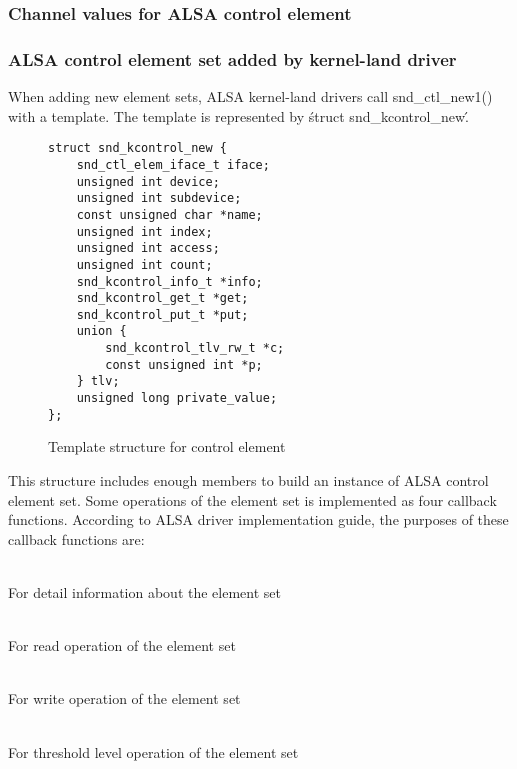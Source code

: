 \documentclass[onecolumn]{article}
\begin{document}
\subsubsection{Channel values for ALSA control element}

\subsubsection{ALSA control element set added by kernel-land driver}

When adding new element sets, ALSA kernel-land drivers call snd\_ctl\_new1() with a template. The template is represented by \'struct snd\_kcontrol\_new\'.

\begin{figure}[htbp]
\small
\begin{verbatim}
struct snd_kcontrol_new {
    snd_ctl_elem_iface_t iface;
    unsigned int device;
    unsigned int subdevice;
    const unsigned char *name;
    unsigned int index;
    unsigned int access;
    unsigned int count;
    snd_kcontrol_info_t *info;
    snd_kcontrol_get_t *get;
    snd_kcontrol_put_t *put;
    union {
        snd_kcontrol_tlv_rw_t *c;
        const unsigned int *p;
    } tlv;
    unsigned long private_value;
};
\end{verbatim}
\caption{{Template structure for control element}}
\label{control-element-template}
\end{figure}

This structure includes enough members to build an instance of ALSA control element set. Some operations of the element set is implemented as four callback functions. According to ALSA driver implementation guide\cite{alsa-driver}, the purposes of these callback functions are:

\begin{description}
\small
\item[snd\_kcontrol\_info\_t] \mbox{} \\
For detail information about the element set
\item[snd\_kcontrol\_get\_t] \mbox{} \\
For read operation of the element set
\item[snd\_kcontrol\_put\_t] \mbox{} \\
For write operation of the element set
\item[snd\_kctl\_tlv\_rw\_t] \mbox{} \\
For threshold level operation of the element set
\end{description}
\end{document}

